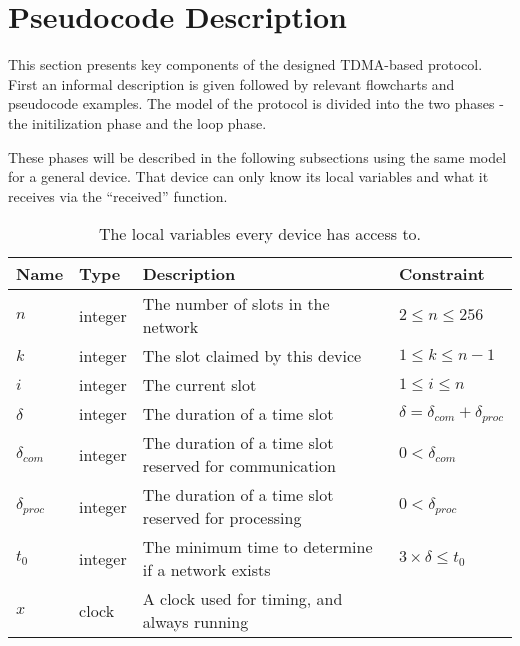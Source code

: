 \section{Pseudocode Description}
This section presents key components of the designed TDMA-based protocol. 
First an informal description is given followed by relevant flowcharts and pseudocode examples. 
The model of the protocol is divided into the two phases - the initilization phase and the loop phase. 

These phases will be described in the following subsections using the same model for a general device. 
That device can only know its local variables and what it receives via the \enquote{received} function.

\begin{table}[H]
    \begin{tabularx}{\textwidth}{l|l|X|l}
        \toprule
        Name                & Type      & Description & Constraint \\
        \midrule
        $n$                 & integer   & The number of slots in the network                        & $2 \leq n \leq 256$\\
        $k$                 & integer   & The slot claimed by this device                           & $1 \leq k \leq n - 1$\\
        $i$                 & integer   & The current slot                                          & $1 \leq i \leq n$\\
        $\delta$            & integer   & The duration of a time slot                               & $\delta = \delta_{com} + \delta_{proc}$\\
        $\delta_{com}$      & integer   & The duration of a time slot reserved for communication    & $0 < \delta_{com}$ \\
        $\delta_{proc}$     & integer   & The duration of a time slot reserved for processing       & $0 < \delta_{proc}$ \\
        $t_0$               & integer   & The minimum time to determine if a network exists         & $3 \times \delta \leq t_0$ \\
        $x$                 & clock     & A clock used for timing, and always running\\
        \bottomrule
    \end{tabularx}
    \caption{The local variables every device has access to.}
    \label{tab:locals}
\end{table}

